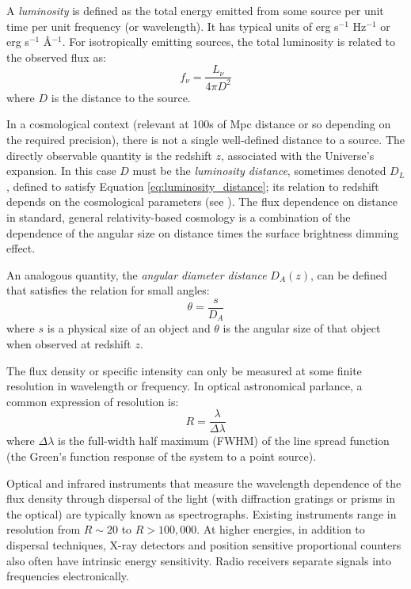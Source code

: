 A {\it luminosity} is defined as the total energy emitted from some
source per unit time per unit frequency (or wavelength). It has
typical units of erg s$^{-1}$ Hz$^{-1}$ or erg s$^{-1}$
\AA$^{-1}$. For isotropically emitting sources, the total luminosity
is related to the observed flux as:
\begin{equation}
\label{eq:luminosity_distance}
f_\nu = \frac{L_\nu}{4\pi D^2}
\end{equation}
where $D$ is the distance to the source.

In a cosmological context (relevant at 100s of Mpc distance or so
depending on the required precision), there is not a single
well-defined distance to a source. The directly observable quantity is
the redshift $z$, associated with the Universe's expansion. In this
case $D$ must be the {\it luminosity distance}, sometimes denoted
$D_L$, defined to satisfy Equation \ref{eq:luminosity_distance}; its
relation to redshift depends on the cosmological parameters
(see \citealt{hogg99cosm}). The flux dependence on distance in
standard, general relativity-based cosmology is a combination of the
dependence of the angular size on distance times the surface
brightness dimming effect.

An analogous quantity, the {\it angular diameter distance} $D_A(z)$,
can be defined that satisfies the relation for small angles:
\begin{equation}
\theta = \frac{s}{D_A}
\end{equation}
where $s$ is a physical size of an object and $\theta$ is the angular
size of that object when observed at redshift $z$.

The flux density or specific intensity can only be measured at some
finite resolution in wavelength or frequency. In optical astronomical
parlance, a common expression of resolution is:
\begin{equation}
R = \frac{\lambda}{\Delta \lambda}
\end{equation}
where $\Delta \lambda$ is the full-width half maximum (FWHM) of the
line spread function (the Green's function response of the system to a
point source).

Optical and infrared instruments that measure the wavelength
dependence of the flux density through dispersal of the light (with
diffraction gratings or prisms in the optical) are typically known as
spectrographs. Existing instruments range in resolution from $R\sim
20$ to $R>100,000$.  At higher energies, in addition to dispersal
techniques, X-ray detectors and position sensitive proportional
counters also often have intrinsic energy sensitivity.  Radio
receivers separate signals into frequencies electronically.

